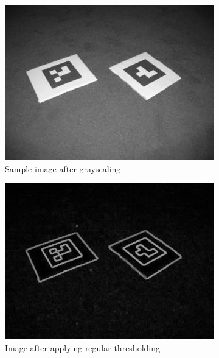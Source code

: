 \begin{figure}[thpb]
	\centering
	\begin{subfigure}[t]{0.45\columnwidth}
		\centering
		\includegraphics[width=\columnwidth]{gray.png}
		\caption{Sample image after grayscaling}
		\label{fig:gray}
	\end{subfigure}
	\begin{subfigure}[t]{0.45\columnwidth}
		\centering
		\includegraphics[width=\columnwidth]{thresh.png}
		\caption{Image after applying regular thresholding}
		\label{fig:thresh}
	\end{subfigure}
	\begin{subfigure}[b]{0.45\columnwidth}
		\centering

\end{subfigure}
\end{figure}

